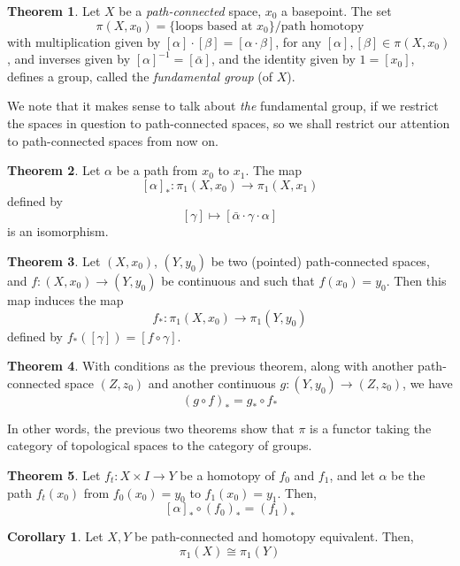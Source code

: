 \documentclass[a4paper,14pt]{extarticle}
\theoremstyle{definition}
\newtheorem*{theorem}{Theorem}
\newtheorem*{corollary}{Corollary}
\begin{document}
\begin{theorem}
  Let $X$ be a \textit{path-connected} space, $x_0$ a basepoint. The set \[\pi(X,x_0)=\{\text{loops based at }x_0\}/\text{path homotopy}\] with multiplication given by $[\alpha]\cdot[\beta]=[\alpha\cdot\beta]$, for any $[\alpha],[\beta]\in
  \pi(X,x_0)$, and inverses given by $[\alpha]^{-1}=[\bar{\alpha}]$,
  and the identity given by $1=[x_0]$, defines a group, called the \textit{fundamental group}
  (of $X$).
\end{theorem}
We note that it makes sense to talk about \textit{the} fundamental group, if we restrict 
the spaces in question to path-connected spaces, so we shall restrict our attention to 
path-connected spaces from now on.

\begin{theorem}
  Let $\alpha$ be a path from $x_0$ to $x_1$. The map \[[\alpha]_*:\pi_1(X,x_0)\rightarrow \pi_1(X,x_1)\] defined by 
  \[[\gamma]\mapsto[\bar{\alpha}\cdot\gamma\cdot\alpha]\] is an isomorphism.
\end{theorem}

\begin{theorem}
  Let $(X,x_0)$, $(Y,y_0)$ be two (pointed) path-connected spaces, and 
  $f:(X,x_0)\rightarrow (Y,y_0)$ be continuous and such that $f(x_0)=y_0$. Then this map 
  induces the map 
  \[f_*:\pi_1(X,x_0)\rightarrow \pi_1(Y,y_0)\] defined by $f_*([\gamma])=[f\circ\gamma]$.
\end{theorem}

\begin{theorem}
  With conditions as the previous theorem, along with another path-connected space 
  $(Z,z_0)$ and another continuous $g:(Y,y_0)\rightarrow (Z,z_0)$, we have 
  \[(g\circ f)_* = g_*\circ f_*\]
\end{theorem}

In other words, the previous two theorems show that $\pi$ is a functor taking 
the category of topological spaces to the category of groups.

\begin{theorem}
  Let $f_t:X\times I\rightarrow Y$ be a homotopy of $f_0$ and $f_1$, and let $\alpha$ 
  be the path $f_t(x_0)$ from $f_0(x_0)=y_0$ to $f_1(x_0)=y_1$. Then,
  \[[\alpha]_*\circ (f_0)_*=(f_1)_*\]
\end{theorem}

\begin{corollary}
  Let $X, Y$ be path-connected and homotopy equivalent. Then,
  \[\pi_1(X)\cong\pi_1(Y)\]
\end{corollary}
\end{document}
